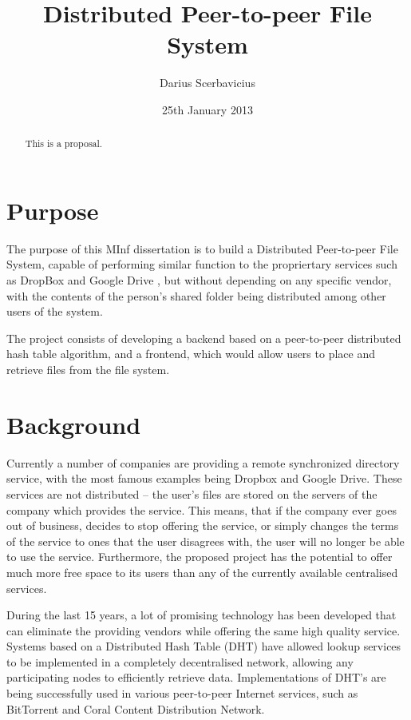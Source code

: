 \documentclass[8pt,a4paper]{article}
\title{Distributed Peer-to-peer File System}
\author{Darius Scerbavicius}
\date{25th January 2013}
\begin{document}
\maketitle

\begin{abstract}
This is a proposal.
\end{abstract}

\section{Purpose}
The purpose of this MInf dissertation is to build a Distributed Peer-to-peer File System, capable of performing similar function to the propriertary services such as DropBox \cite{dropbox} and Google Drive \cite{gdrive}, but without depending on any specific vendor, with the contents of the person's shared folder being distributed among other users of the system. 

The project consists of developing a backend based on a peer-to-peer distributed hash table algorithm, and a frontend, which would allow users to place and retrieve files from the file system.

\section{Background}

Currently a number of companies are providing a remote synchronized directory service, with the most famous examples being Dropbox and Google Drive. These services are not distributed -- the user's files are stored on the servers of the company which provides the service. This means, that if the company ever goes out of business, decides to stop offering the service, or simply changes the terms of the service to ones that the user disagrees with, the user will no longer be able to use the service. 
Furthermore, the proposed project has the potential to offer much more free space to its users than any of the currently available centralised services.

During the last 15 years, a lot of promising technology has been developed that can eliminate the providing vendors while offering the same high quality service. 
Systems based on a Distributed Hash Table (DHT) have allowed lookup services to be implemented in a completely decentralised network, allowing any participating nodes to efficiently retrieve data. Implementations of DHT's are being successfully used in various peer-to-peer Internet services, such as BitTorrent and Coral Content Distribution Network.
\end{document}

